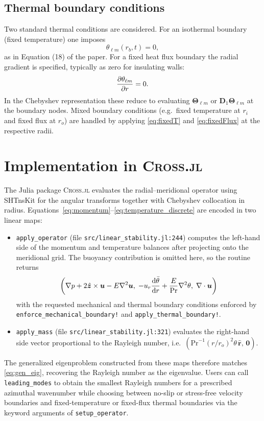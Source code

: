 \documentclass[11pt]{article}
\numberwithin{equation}{section}
\begin{document}
\subsection{Thermal boundary conditions}
Two standard thermal conditions are considered. For an isothermal boundary (fixed temperature) one imposes
\begin{equation}
  \theta_{\ell m}(r_b, t) = 0,
  \label{eq:fixedT}
\end{equation}
as in Equation (18) of the paper. For a fixed heat flux boundary the radial gradient is specified, typically as zero for insulating walls:
\begin{equation}
  \pdv{\theta_{\ell m}}{r}(r_b, t) = 0.
  \label{eq:fixedFlux}
\end{equation}
In the Chebyshev representation these reduce to evaluating $\bm{\Theta}_{\ell m}$ or $\bm{D}_1 \bm{\Theta}_{\ell m}$ at the boundary nodes. Mixed boundary conditions (e.g.\ fixed temperature at $r_i$ and fixed flux at $r_o$) are handled by applying \eqref{eq:fixedT} and \eqref{eq:fixedFlux} at the respective radii.

\section{Implementation in \textsc{Cross.jl}}
The Julia package \textsc{Cross.jl} evaluates the radial--meridional operator using SHTnsKit for the angular transforms together with Chebyshev collocation in radius. Equations~\eqref{eq:momentum}--\eqref{eq:temperature_discrete} are encoded in two linear maps:
\begin{itemize}
  \item \texttt{apply\_operator} (file \texttt{src/linear\_stability.jl:244}) computes the left-hand side of the momentum and temperature balances after projecting onto the meridional grid. The buoyancy contribution is omitted here, so the routine returns
  \[
    \qty(\nabla p + 2 \hat{\bm{z}}\times \bm{u} - E \nabla^2 \bm{u},\;
          -u_r \dv{\bar{\theta}}{r} + \frac{E}{\mathrm{Pr}} \nabla^2 \theta,\;
          \nabla \cdot \bm{u})
  \]
  with the requested mechanical and thermal boundary conditions enforced by \texttt{enforce\_mechanical\_boundary!} and \texttt{apply\_thermal\_boundary!}.
  \item \texttt{apply\_mass} (file \texttt{src/linear\_stability.jl:321}) evaluates the right-hand side vector proportional to the Rayleigh number, i.e.\ $(\mathrm{Pr}^{-1}(r/r_o)^2 \theta\,\hat{\bm{r}},\,\bm{0})$.
\end{itemize}
The generalized eigenproblem constructed from these maps therefore matches \eqref{eq:gen_eig}, recovering the Rayleigh number as the eigenvalue. Users can call \texttt{leading\_modes} to obtain the smallest Rayleigh numbers for a prescribed azimuthal wavenumber while choosing between no-slip or stress-free velocity boundaries and fixed-temperature or fixed-flux thermal boundaries via the keyword arguments of \texttt{setup\_operator}.
\end{document}
